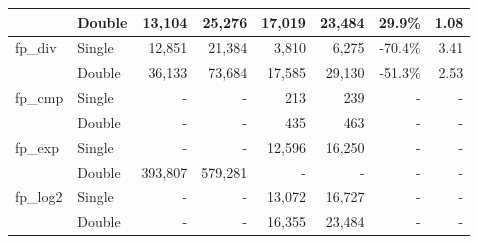 \begin{table}[]
\begin{tabular}{l|l||rr||rr||rr}
                            & Double                                          & 13,104                      & 25,276                           & 17,019                      & 23,484                           & 29.9\%                  & 1.08                    \\ \hline \hline
\multirow{2}{*}{fp\_div}    & Single                                          & 12,851                      & 21,384                           & 3,810                       & 6,275                            & -70.4\%                 & 3.41                    \\
                            & Double                                          & 36,133                      & 73,684                           & 17,585                      & 29,130                           & -51.3\%                 & 2.53                    \\ \hline \hline
\multirow{2}{*}{fp\_cmp}    & Single                                          & -                           & -                                & 213                         & 239                              & -                       & -                       \\
                            & Double                                          & -                           & -                                & 435                         & 463                              & -                       & -                       \\ \hline \hline
\multirow{2}{*}{fp\_exp}    & Single                                          & -                           & -                                & 12,596                      & 16,250                           & -                       & -                       \\
                            & Double                                          & 393,807                     & 579,281                          & -                           & -                                & -                       & -                       \\ \hline \hline
\multirow{2}{*}{fp\_log2}   & Single                                          & -                           & -                                & 13,072                      & 16,727                           & -                       & -                       \\
                            & Double                                          & -                           & -                                & 16,355                      & 23,484                           & -                       & -                       \\ \hline \hline

\end{tabular}
\end{table}
